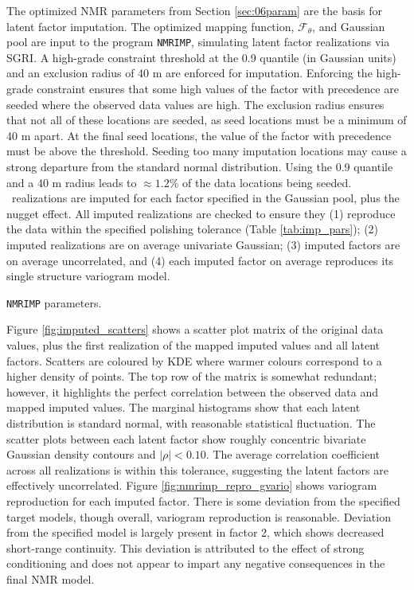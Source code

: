 The optimized \gls{NMR} parameters from Section \ref{sec:06param} are the basis for latent factor imputation. The optimized mapping function, $\mathcal{F}_{\theta}$, and Gaussian pool are input to the program \texttt{NMRIMP}, simulating latent factor realizations via \gls{SGRI}. A high-grade constraint threshold at the 0.9 quantile (in Gaussian units) and an exclusion radius of 40 m are enforced for imputation. Enforcing the high-grade constraint ensures that some high values of the factor with precedence are seeded where the observed data values are high. The exclusion radius ensures that not all of these locations are seeded, as seed locations must be a minimum of 40 m apart. At the final seed locations, the value of the factor with precedence must be above the threshold. Seeding too many imputation locations may cause a strong departure from the standard normal distribution. Using the 0.9 quantile and a 40 m radius leads to $\approx 1.2\%$ of the data locations being seeded. \csnreals \ realizations are imputed for each factor specified in the Gaussian pool, plus the nugget effect. All imputed realizations are checked to ensure they (1) reproduce the data within the specified polishing tolerance (Table \ref{tab:imp_pars}); (2) imputed realizations are on average univariate Gaussian; (3) imputed factors are on average uncorrelated, and (4) each imputed factor on average reproduces its single structure variogram model.

\begin{table}[!htb]
    \centering
    \caption{\texttt{NMRIMP} parameters.}
    \resizebox{0.9\width}{!}{}
    \label{tab:imp_pars}
\end{table}

Figure \ref{fig:imputed_scatters} shows a scatter plot matrix of the original data values, plus the first realization of the mapped imputed values and all latent factors. Scatters are coloured by \gls{KDE} where warmer colours correspond to a higher density of points. The top row of the matrix is somewhat redundant; however, it highlights the perfect correlation between the observed data and mapped imputed values. The marginal histograms show that each latent distribution is standard normal, with reasonable statistical fluctuation. The scatter plots between each latent factor show roughly concentric bivariate Gaussian density contours and $|\rho| < 0.10$. The average correlation coefficient across all realizations is within this tolerance, suggesting the latent factors are effectively uncorrelated. Figure \ref{fig:nmrimp_repro_gvario} shows variogram reproduction for each imputed factor. There is some deviation from the specified target models, though overall, variogram reproduction is reasonable. Deviation from the specified model is largely present in factor 2, which shows decreased short-range continuity. This deviation is attributed to the effect of strong conditioning and does not appear to impart any negative consequences in the final \gls{NMR} model.

